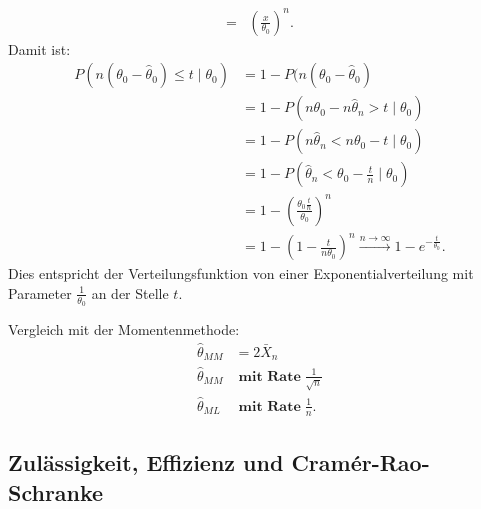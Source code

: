 \documentclass[10pt]{article}
\newenvironment{BSP}[1][]
{\begin{Beispiel}[frametitle=#1]}{\end{Beispiel}}
\begin{document}
\begin{BSP}[Beispiel Grenzverteilung keine Normalverteilung]
\begin{equation*}
\begin{split}
				=& \left(\frac{x}{\theta_0}\right)^n.
			\end{split}
		\end{equation*}
		Damit ist:
		\begin{equation*}
			\begin{split}
				P (n(\theta_0 -\hat{\theta}_0) \leq t \mid \theta_0) &= 1-P(n(\theta_0 -\hat{\theta}_0) \\
				&= 1- P(n \theta_0 -n\hat{\theta}_n > t \mid \theta_0)\\
				&= 1- P(n\hat{\theta}_n < n\theta_0 - t \mid \theta_0)\\
				&= 1- P\left(\hat{\theta}_n < \theta_0 - \frac{t}{n} \mid \theta_0 \right)\\
				&= 1- \left(\frac{\theta_0 \frac{t}{n}}{\theta_0}\right)^n\\
				&= 1- \left(1-\frac{t}{n \theta_0}\right)^n \overset{n\rightarrow \infty}\longrightarrow 1-e^{-\frac{t}{\theta_0}}.
			\end{split}
		\end{equation*}
		Dies entspricht der Verteilungsfunktion von einer Exponentialverteilung mit Parameter $\frac{1}{\theta_0}$ an der Stelle $t$.
		
		Vergleich mit der Momentenmethode:
		\begin{equation*}
			\begin{split}
				\hat{\theta}_{MM}& = 2 \bar{X}_n\\
				\hat{\theta}_{MM}& \; \textbf{mit Rate} \;\frac{1}{\sqrt{n}}\\
				\hat{\theta}_{ML}& \; \textbf{mit Rate} \;\frac{1}{n}.
			\end{split}
		\end{equation*}
	\end{BSP}
	
	\subsection{Zulässigkeit, Effizienz und Cramér-Rao-Schranke}
	
	
	
\end{document}
